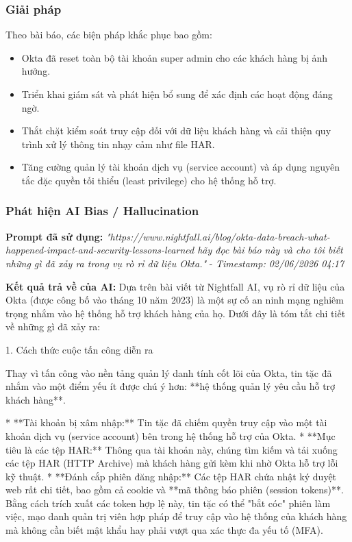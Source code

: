\subsubsection{Giải pháp}
Theo bài báo, các biện pháp khắc phục bao gồm:

\begin{itemize}
    \item Okta đã reset toàn bộ tài khoản super admin cho các khách hàng bị ảnh hưởng.
    \item Triển khai giám sát và phát hiện bổ sung để xác định các hoạt động đáng ngờ.
    \item Thắt chặt kiểm soát truy cập đối với dữ liệu khách hàng và cải thiện quy trình xử lý thông tin nhạy cảm như file HAR.
    \item Tăng cường quản lý tài khoản dịch vụ (service account) và áp dụng nguyên tắc đặc quyền tối thiểu (least privilege) cho hệ thống hỗ trợ.
\end{itemize}

\subsubsection{Phát hiện AI Bias / Hallucination}

\textbf{Prompt đã sử dụng:} \textit{"{https://www.nightfall.ai/blog/okta-data-breach-what-happened-impact-and-security-lessons-learned} hãy đọc bài báo này và cho tôi biết những gì đã xảy ra trong vụ rò rỉ dữ liệu Okta."} - \textit{Timestamp: 02/06/2026 04:17}

\textbf{Kết quả trả về của AI:}
Dựa trên bài viết từ Nightfall AI, vụ rò rỉ dữ liệu của Okta (được công bố vào tháng 10 năm 2023) là một sự cố an ninh mạng nghiêm trọng nhắm vào hệ thống hỗ trợ khách hàng của họ. Dưới đây là tóm tắt chi tiết về những gì đã xảy ra:

1. Cách thức cuộc tấn công diễn ra

Thay vì tấn công vào nền tảng quản lý danh tính cốt lõi của Okta, tin tặc đã nhắm vào một điểm yếu ít được chú ý hơn: **hệ thống quản lý yêu cầu hỗ trợ khách hàng**.

* **Tài khoản bị xâm nhập:** Tin tặc đã chiếm quyền truy cập vào một tài khoản dịch vụ (service account) bên trong hệ thống hỗ trợ của Okta.
* **Mục tiêu là các tệp HAR:** Thông qua tài khoản này, chúng tìm kiếm và tải xuống các tệp HAR (HTTP Archive) mà khách hàng gửi kèm khi nhờ Okta hỗ trợ lỗi kỹ thuật.
* **Đánh cắp phiên đăng nhập:** Các tệp HAR chứa nhật ký duyệt web rất chi tiết, bao gồm cả cookie và **mã thông báo phiên (session tokens)**. Bằng cách trích xuất các token hợp lệ này, tin tặc có thể "bắt cóc" phiên làm việc, mạo danh quản trị viên hợp pháp để truy cập vào hệ thống của khách hàng mà không cần biết mật khẩu hay phải vượt qua xác thực đa yếu tố (MFA).

